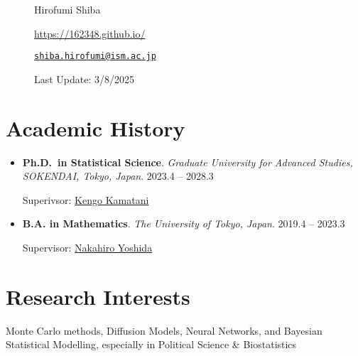 \documentclass[
  11pt,
]{article}
\date{}
\renewcommand{\labelitemi}{\textcolor{minty}{\faCheckCircle}} %
\begin{document}
\begin{figure}

\begin{minipage}{0.50\linewidth}
\Huge Hirofumi Shiba\end{minipage}%
%
\begin{minipage}{0.50\linewidth}

\color{minty}

\hfill {} \url{https://162348.github.io/}

\par

\hfill {}
\href{mailto:shiba.hirofumi@ism.ac.jp}{\nolinkurl{shiba.hirofumi@ism.ac.jp}}

\par

\color{gray}\hfill {Last Update: 3/8/2025}\end{minipage}%

\end{figure}%

\vspace{-1em}

\section{Academic History}\label{academic-history}

\renewcommand{\labelitemi}{\textcolor{minty}{\faGraduationCap}}

\begin{itemize}
\item
  \textbf{Ph.D.~in Statistical Science}. \emph{Graduate University for
  Advanced Studies, SOKENDAI, Tokyo, Japan}. \hfill {2023.4 -- 2028.3}

  Superivsor:
  \href{https://sites.google.com/view/kengokamatani/home}{Kengo
  Kamatani}
\item
  \textbf{B.A. in Mathematics}. \emph{The University of Tokyo, Japan}.
  \hfill {2019.4 -- 2023.3}

  Supervisor:
  \href{https://www.ms.u-tokyo.ac.jp/~nakahiro/hp-naka-e}{Nakahiro
  Yoshida}
\end{itemize}

\section{Research Interests}\label{research-interests}

Monte Carlo methods, Diffusion Models, Neural Networks, and Bayesian
Statistical Modelling, especially in Political Science \& Biostatistics
\end{document}
